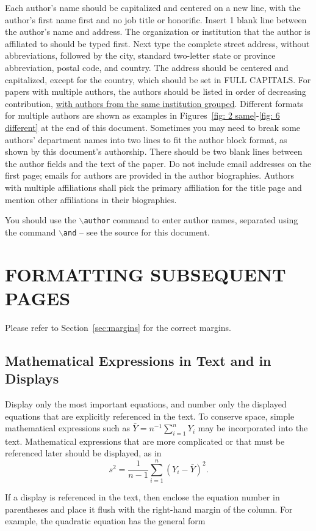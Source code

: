 \documentclass{wscpaperproc}
\theoremstyle{wsc}
\begin{document}
Each author's name should be capitalized and centered on a new line, with the author's first name first and no job title or honorific.
Insert 1 blank line between the author's name and address. 
The organization or institution that the author is affiliated to should be typed first.
Next type the complete street address, without abbreviations, followed by the city, standard two-letter state or province abbreviation, postal code, and country.
The address should be centered and capitalized, except for the country, which should be set in FULL CAPITALS.
For papers with multiple authors, the authors should be listed in order of decreasing contribution, \underline{with authors from the same institution grouped}.
Different formats for multiple authors are shown as examples in Figures~\ref{fig: 2 same}-\ref{fig: 6 different} at the end of this document.
Sometimes you may need to break some authors’ department names into two lines to fit the author block format, as shown by this document’s authorship.
There should be two blank lines between the author fields and the text of the paper. 
Do not include email addresses on the first page; emails for authors are provided in the author biographies. Authors with multiple affiliations shall pick the primary affiliation for the title page and mention other affiliations in their biographies.

You should use the {\tt $\backslash$author} command to enter author names, separated using the command {\tt $\backslash$and} -- see the source for this document.

\section{FORMATTING SUBSEQUENT PAGES}
Please refer to Section~\ref{sec:margins} for the correct margins.

\subsection{Mathematical Expressions in Text and in Displays}
Display only the most important equations, and number only the displayed equations that are explicitly referenced in the text.
To conserve space, simple mathematical expressions such as $\bar Y = n^{-1} \sum_{i=1}^n Y_i$ may be incorporated into the text.
Mathematical expressions that are more complicated or that must be referenced later should be displayed, as in
$$s^2 = \frac 1 {n-1} \sum_{i=1}^n (Y_i - \bar Y)^2.$$

If a display is referenced in the text, then enclose the equation number in parentheses and place it flush with the right-hand margin of the
column. For example, the quadratic equation has the general form
\end{document}
